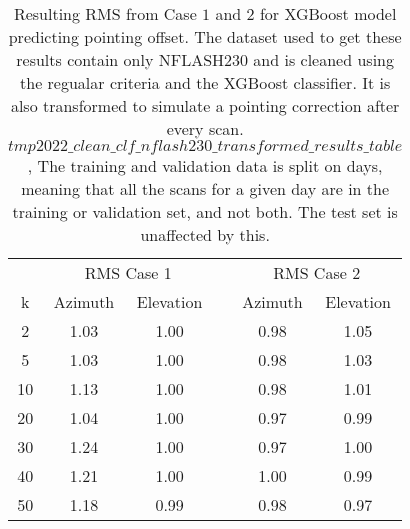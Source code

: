\begin{table}[h]
    \centering
    \caption{Resulting RMS from Case $1$ and $2$ for XGBoost model predicting pointing offset.
    The dataset used to get these results contain only NFLASH230 and is cleaned using the regualar criteria and the XGBoost classifier.
    It is also transformed to simulate a pointing correction after every scan.
    $tmp2022\_clean\_clf\_nflash230\_transformed\_results\_table$,
    The training and validation data is split on days, meaning that all the scans for a given day
    are in the training or validation set, and not both. The test set is unaffected by this.}
    \begin{tabular}{ccc c cc}
        \toprule
        \multicolumn{1}{c}{} & \multicolumn{2}{c}{RMS Case 1} & & \multicolumn{2}{c}{RMS Case 2} \\
        \cmidrule(lr){2-3} \cmidrule(lr){5-6}
         k & Azimuth & Elevation & & Azimuth & Elevation \\
        \midrule
         2 &  1.03 & 1.00 & & 0.98 &  1.05 \\
         5 &  1.03 & 1.00 & & 0.98 &  1.03 \\
        10 &  1.13 & 1.00 & & 0.98 &  1.01 \\
        20 &  1.04 & 1.00 & & 0.97 &  0.99 \\
        30 &  1.24 & 1.00 & & 0.97 &  1.00 \\
        40 &  1.21 & 1.00 & & 1.00 &  0.99 \\
        50 &  1.18 & 0.99 & & 0.98 &  0.97 \\
        \bottomrule
    \end{tabular}
\end{table}

